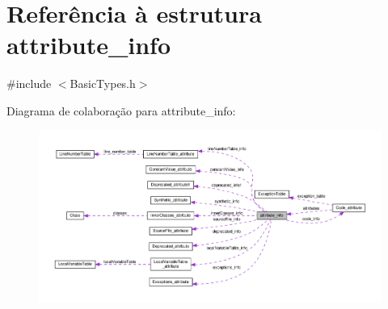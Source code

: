 \hypertarget{structattribute__info}{}\section{Referência à estrutura attribute\+\_\+info}
\label{structattribute__info}


{\ttfamily \#include $<$Basic\+Types.\+h$>$}



Diagrama de colaboração para attribute\+\_\+info\+:\nopagebreak
\begin{figure}[H]
\begin{center}
\leavevmode
\includegraphics[width=350pt]{structattribute__info__coll__graph}
\end{center}
\end{figure}
